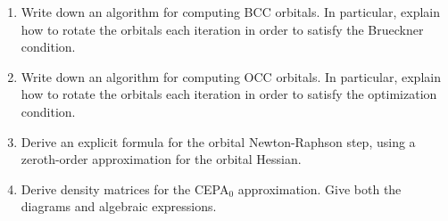 \documentclass[11pt]{article}
\begin{document}
\begin{enumerate}
\item
Write down an algorithm for computing BCC orbitals.  In particular, explain how to rotate the orbitals each iteration in order to satisfy the Brueckner condition.


\item
Write down an algorithm for computing OCC orbitals.    In particular, explain how to rotate the orbitals each iteration in order to satisfy the optimization condition.

\item
Derive an explicit formula for the orbital Newton-Raphson step, using a zeroth-order approximation for the orbital Hessian.

\item
Derive density matrices for the CEPA$_0$ approximation.
Give both the diagrams and algebraic expressions.


\end{enumerate}
\end{document}
